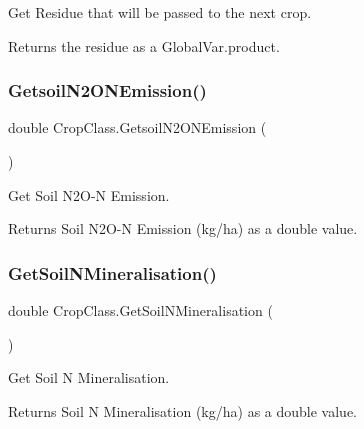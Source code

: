 Get Residue that will be passed to the next crop. 

\begin{DoxyReturn}{Returns}
the residue as a Global\+Var.\+product. 
\end{DoxyReturn}
\mbox{\label{class_crop_class_abc1b073bf352a5f60c62f4a2601b4ac3}} 
\subsubsection{\texorpdfstring{GetsoilN2ONEmission()}{GetsoilN2ONEmission()}}
{\footnotesize\ttfamily double Crop\+Class.\+Getsoil\+N2\+O\+N\+Emission (\begin{DoxyParamCaption}{ }\end{DoxyParamCaption})\hspace{0.3cm}{\ttfamily [inline]}}



Get Soil N2\+O-\/N Emission. 

\begin{DoxyReturn}{Returns}
Soil N2\+O-\/N Emission (kg/ha) as a double value. 
\end{DoxyReturn}
\mbox{\label{class_crop_class_aad6835cd38f0a070983bade11afd9df1}} 
\subsubsection{\texorpdfstring{GetSoilNMineralisation()}{GetSoilNMineralisation()}}
{\footnotesize\ttfamily double Crop\+Class.\+Get\+Soil\+N\+Mineralisation (\begin{DoxyParamCaption}{ }\end{DoxyParamCaption})\hspace{0.3cm}{\ttfamily [inline]}}



Get Soil N Mineralisation. 

\begin{DoxyReturn}{Returns}
Soil N Mineralisation (kg/ha) as a double value. 
\end{DoxyReturn}
\mbox{\label{class_crop_class_a33c608750cdab30a96f2ac722718f775}} 
